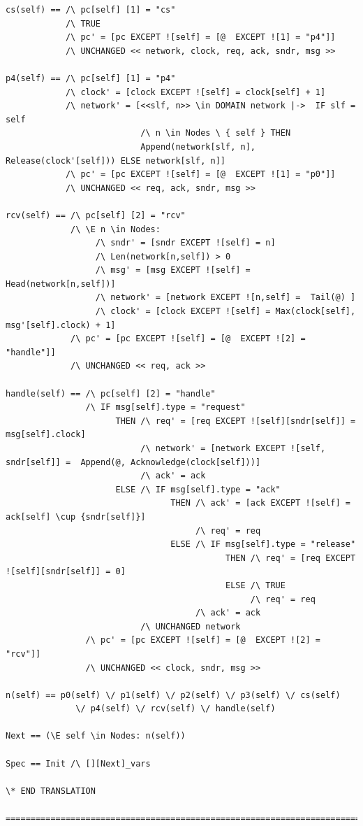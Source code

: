 \documentclass{thesul}
\begin{document}
\begin{appendices}
\begin{lstlisting}[caption = TLA+ translation for Sub-Processes, frame = tlrb, firstnumber = 1]
cs(self) == /\ pc[self] [1] = "cs"
            /\ TRUE
            /\ pc' = [pc EXCEPT ![self] = [@  EXCEPT ![1] = "p4"]]
            /\ UNCHANGED << network, clock, req, ack, sndr, msg >>

p4(self) == /\ pc[self] [1] = "p4"
            /\ clock' = [clock EXCEPT ![self] = clock[self] + 1]
            /\ network' = [<<slf, n>> \in DOMAIN network |->  IF slf = self 
                           /\ n \in Nodes \ { self } THEN 
                           Append(network[slf, n], Release(clock'[self])) ELSE network[slf, n]]
            /\ pc' = [pc EXCEPT ![self] = [@  EXCEPT ![1] = "p0"]]
            /\ UNCHANGED << req, ack, sndr, msg >>

rcv(self) == /\ pc[self] [2] = "rcv"
             /\ \E n \in Nodes:
                  /\ sndr' = [sndr EXCEPT ![self] = n]
                  /\ Len(network[n,self]) > 0 
                  /\ msg' = [msg EXCEPT ![self] = Head(network[n,self])]
                  /\ network' = [network EXCEPT ![n,self] =  Tail(@) ]
                  /\ clock' = [clock EXCEPT ![self] = Max(clock[self], msg'[self].clock) + 1]
             /\ pc' = [pc EXCEPT ![self] = [@  EXCEPT ![2] = "handle"]]
             /\ UNCHANGED << req, ack >>

handle(self) == /\ pc[self] [2] = "handle"
                /\ IF msg[self].type = "request"
                      THEN /\ req' = [req EXCEPT ![self][sndr[self]] = msg[self].clock]
                           /\ network' = [network EXCEPT ![self, sndr[self]] =  Append(@, Acknowledge(clock[self]))]
                           /\ ack' = ack
                      ELSE /\ IF msg[self].type = "ack"
                                 THEN /\ ack' = [ack EXCEPT ![self] = ack[self] \cup {sndr[self]}]
                                      /\ req' = req
                                 ELSE /\ IF msg[self].type = "release"
                                            THEN /\ req' = [req EXCEPT ![self][sndr[self]] = 0]
                                            ELSE /\ TRUE
                                                 /\ req' = req
                                      /\ ack' = ack
                           /\ UNCHANGED network
                /\ pc' = [pc EXCEPT ![self] = [@  EXCEPT ![2] = "rcv"]]
                /\ UNCHANGED << clock, sndr, msg >>

n(self) == p0(self) \/ p1(self) \/ p2(self) \/ p3(self) \/ cs(self)
              \/ p4(self) \/ rcv(self) \/ handle(self)

Next == (\E self \in Nodes: n(self))

Spec == Init /\ [][Next]_vars

\* END TRANSLATION

=============================================================================

\end{lstlisting}

\end{appendices}



\end{document}
